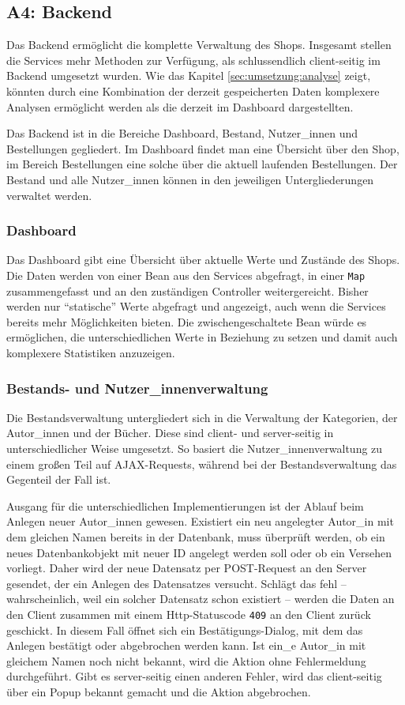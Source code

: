 	\subsection{A4: Backend}\label{sec:umsetzung:backend}
	Das Backend ermöglicht die komplette Verwaltung des Shops. Insgesamt stellen die Services mehr Methoden zur Verfügung, als schlussendlich client-seitig im Backend umgesetzt wurden. Wie das Kapitel \ref{sec:umsetzung:analyse} zeigt, könnten durch eine Kombination der derzeit gespeicherten Daten komplexere Analysen ermöglicht werden als die derzeit im Dashboard dargestellten.
	
	Das Backend ist in die Bereiche Dashboard, Bestand, Nutzer\_innen und Bestellungen gegliedert. Im Dashboard findet man eine Übersicht über den Shop, im Bereich Bestellungen eine solche über die aktuell laufenden Bestellungen. Der Bestand und alle Nutzer\_innen können in den jeweiligen Untergliederungen verwaltet werden.
	
		\subsubsection{Dashboard}
		Das Dashboard gibt eine Übersicht über aktuelle Werte und Zustände des Shops. Die Daten werden von einer Bean aus den Services abgefragt, in einer \lstinline|Map| zusammengefasst und an den zuständigen Controller weitergereicht. Bisher werden nur "`statische"' Werte abgefragt und angezeigt, auch wenn die Services bereits mehr Möglichkeiten bieten. Die zwischengeschaltete Bean würde es ermöglichen, die unterschiedlichen Werte in Beziehung zu setzen und damit auch komplexere Statistiken anzuzeigen.
	
		\subsubsection{Bestands- und Nutzer\_innenverwaltung}
		Die Bestandsverwaltung untergliedert sich in die Verwaltung der Kategorien, der Autor\_innen und der Bücher. Diese sind client- und server-seitig in unterschiedlicher Weise umgesetzt. So basiert die Nutzer\_innenverwaltung zu einem großen Teil auf AJAX-Requests, während bei der Bestandsverwaltung das Gegenteil der Fall ist.
		
		Ausgang für die unterschiedlichen Implementierungen ist der Ablauf beim Anlegen neuer Autor\_innen gewesen. Existiert ein neu angelegter Autor\_in mit dem gleichen Namen bereits in der Datenbank, muss überprüft werden, ob ein neues Datenbankobjekt mit neuer ID angelegt werden soll oder ob ein Versehen vorliegt. Daher wird der neue Datensatz per POST-Request an den Server gesendet, der ein Anlegen des Datensatzes versucht. Schlägt das fehl -- wahrscheinlich, weil ein solcher Datensatz schon existiert -- werden die Daten an den Client zusammen mit einem Http-Statuscode \lstinline|409| an den Client zurück geschickt. In diesem Fall öffnet sich ein Bestätigungs-Dialog, mit dem das Anlegen bestätigt oder abgebrochen werden kann. Ist ein\_e Autor\_in mit gleichem Namen noch nicht bekannt, wird die Aktion ohne Fehlermeldung durchgeführt. Gibt es server-seitig einen anderen Fehler, wird das client-seitig über ein Popup bekannt gemacht und die Aktion abgebrochen.
		

